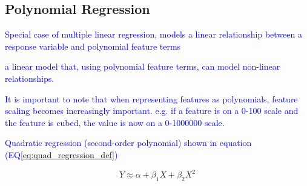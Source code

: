 \subsection{Polynomial Regression}


\textcolor{blue}{Special case of multiple linear regression, models a linear relationship between a response variable and polynomial feature terms}

\textcolor{blue}{a linear model that, using polynomial feature terms, can model non-linear relationships.}

\textcolor{blue}{It is important to note that when representing features as polynomials, feature scaling becomes increasingly important. e.g. if a feature is on a 0-100 scale and the feature is cubed, the value is now on a 0-1000000 scale.}

\textcolor{blue}{Quadratic regression (second-order polynomial) shown in equation (EQ\ref{eq:quad_regression_def})}

\begin{equation}
{Y \approx \alpha + \beta_1 X + \beta_2 X^2}
\label{eq:quad_regression_def}
\end{equation}








